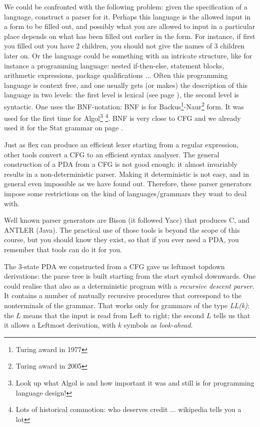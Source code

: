We could be confronted with the following problem: given the
specification of a language, construct a parser for it. Perhaps this
language is the allowed input in a form to be filled out, and possibly
what you are allowed to input in a particular place depends on what
has been filled out earlier in the form. For instance, if first you
filled out you have 2 children, you should not give the names of 3
children later on. Or the language could be something with an
intricate structure, like for instance a programming language: nested
if-then-else, statement blocks, arithmetic expressions,
package qualifications ... Often this programming language is context
free, and one usually gets (or makes) the description of this language
in two levels: the first level is lexical (see page
\pageref{flexlabel}), the second level is syntactic. One uses the
BNF-notation: BNF is for Backus\footnote{Turing award in
  1977}-Naur\footnote{Turing award in 2005} form. It was used for the
first time for Algol\footnote{Look up what Algol is and how important
  it was and still is for programming language design!} \footnote{Lots
  of historical commotion: who deserves credit ... wikipedia tells you
  a lot}. BNF is very close to CFG and we already used it for the Stat
grammar on page \pageref{statlabel}.

Just as flex can produce an efficient lexer starting from a regular
expression, other tools convert a CFG to an efficient syntax
analyser. The general construction of a PDA from a CFG is not good
enough: it almost invariably results in a non-deterministic parser.
Making it deterministic is not easy, and in general even impossible as
we have found out. Therefore, these parser generators impose
some restrictions on the kind of languages/grammars they want to deal
with.

Well known parser generators are Bison (it followed Yacc) that
produces C, and ANTLER (Java). The practical use of those tools is
beyond the scope of this course, but you should know they exist, so
that if you ever need a PDA, you remember that tools can do it for
you.


The 3-state PDA we constructed from a CFG gave us leftmost topdown
derivations: the parse tree is built starting from the start symbol
downwards. One could realise that also as a deterministic program with
a {\em recursive descent parser}. It contains a number of mutually
recursive procedures that correspond to the nonterminals of the
grammar. That works only for grammars of the type {\em LL(k)}: the
$L$ means that the input is read from Left to right; the second $L$
tells us that it allows a Leftmost derivation, with $k$ symbols as
{\em look-ahead}.

